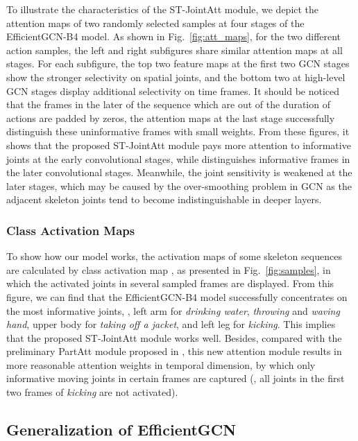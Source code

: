 \documentclass[10pt,journal,compsoc]{IEEEtran}
\begin{document}
To illustrate the characteristics of the ST-JointAtt module, we depict the attention maps of two randomly selected samples at four stages of the EfficientGCN-B4 model. As shown in Fig.~\ref{fig:att_maps}, for the two different action samples, the left and right subfigures share similar attention maps at all stages. For each subfigure, the top two feature maps at the first two GCN stages show the stronger selectivity on spatial joints, and the bottom two at high-level GCN stages display additional selectivity on time frames. It should be noticed that the frames in the later of the sequence which are out of the duration of actions are padded by zeros, the attention maps at the last stage successfully distinguish these uninformative frames with small weights. From these figures, it shows that the proposed ST-JointAtt module pays more attention to informative joints at the early convolutional stages, while distinguishes informative frames in the later convolutional stages. Meanwhile, the joint sensitivity is weakened at the later stages, which may be caused by the over-smoothing problem in GCN as the adjacent skeleton joints tend to become indistinguishable in deeper layers.

\subsubsection{Class Activation Maps}
\label{sssec:cam}

To show how our model works, the activation maps of some skeleton sequences are calculated by class activation map \cite{learning2016zhou}, as presented in Fig.~\ref{fig:samples}, in which the activated joints in several sampled frames are displayed. From this figure, we can find that the EfficientGCN-B4 model successfully concentrates on the most informative joints, \ie, left arm for {\it drinking water}, {\it throwing} and {\it waving hand}, upper body for {\it taking off a jacket}, and left leg for {\it kicking}. This implies that the proposed ST-JointAtt module works well. Besides, compared with the preliminary PartAtt module proposed in \cite{song2020stronger}, this new attention module results in more reasonable attention weights in temporal dimension, by which only informative moving joints in certain frames are captured (\eg, all joints in the first two frames of {\it kicking} are not activated).

\subsection{Generalization of EfficientGCN}
\label{ssec:generalization}
\end{document}
